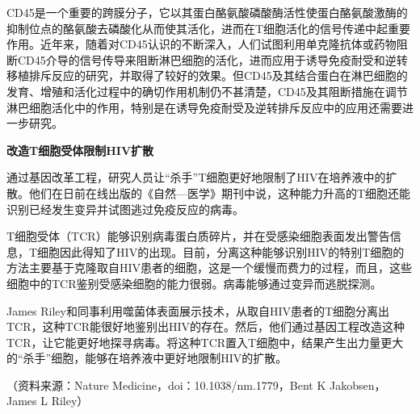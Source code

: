 CD45是一个重要的跨膜分子，它以其蛋白酪氨酸磷酸酶活性使蛋白酪氨酸激酶的抑制位点的酪氨酸去磷酸化从而使其活化，进而在T细胞活化的信号传递中起重要作用。近年来，随着对CD45认识的不断深入，人们试图利用单克隆抗体或药物阻断CD45介导的信号传导来阻断淋巴细胞的活化，进而应用于诱导免疫耐受和逆转移植排斥反应的研究，并取得了较好的效果。但CD45及其结合蛋白在淋巴细胞的发育、增殖和活化过程中的确切作用机制仍不甚清楚，CD45及其阻断措施在调节淋巴细胞活化中的作用，特别是在诱导免疫耐受及逆转排斥反应中的应用还需要进一步研究。

\begin{center}
 \textbf{\Large 改造T细胞受体限制HIV扩散}
 \end{center}

通过基因改革工程，研究人员让“杀手”T细胞更好地限制了HIV在培养液中的扩散。他们在日前在线出版的《自然---医学》期刊中说，这种能力升高的T细胞还能识别已经发生变异并试图逃过免疫反应的病毒。

T细胞受体（TCR）能够识别病毒蛋白质碎片，并在受感染细胞表面发出警告信息，T细胞因此得知了HIV的出现。目前，分离这种能够识别HIV的特别T细胞的方法主要基于克隆取自HIV患者的细胞，这是一个缓慢而费力的过程，而且，这些细胞中的TCR鉴别受感染细胞的能力很弱。病毒能够通过变异而逃脱探测。

James
Riley和同事利用噬菌体表面展示技术，从取自HIV患者的T细胞分离出TCR，这种TCR能很好地鉴别出HIV的存在。然后，他们通过基因工程改造这种TCR，让它能更好地探寻病毒。将这种TCR置入T细胞中，结果产生出力量更大的“杀手”细胞，能够在培养液中更好地限制HIV的扩散。

（资料来源：Nature Medicine，doi：10.1038/nm.1779，Bent K
Jakobsen，James L Riley）

